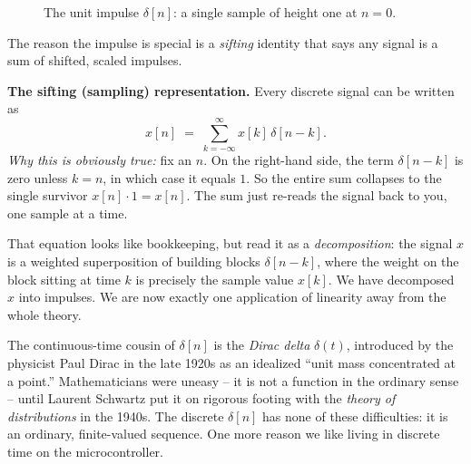 \begin{figure}[H]
\centering
{}
\caption{The unit impulse $\delta[n]$: a single sample of height one at $n=0$.}
\label{ch12:fig-impulse}
\end{figure}

The reason the impulse is special is a \emph{sifting} identity that says any
signal is a sum of shifted, scaled impulses.

\begin{formalbox}
\textbf{The sifting (sampling) representation.} Every discrete signal can be
written as
\[
  x[n] \;=\; \sum_{k=-\infty}^{\infty} x[k]\,\delta[n-k].
\]
\emph{Why this is obviously true:} fix an $n$. On the right-hand side, the term
$\delta[n-k]$ is zero unless $k=n$, in which case it equals $1$. So the entire
sum collapses to the single survivor $x[n]\cdot 1 = x[n]$. The sum just re-reads
the signal back to you, one sample at a time.
\end{formalbox}

That equation looks like bookkeeping, but read it as a \emph{decomposition}: the
signal $x$ is a weighted superposition of building blocks $\delta[n-k]$, where
the weight on the block sitting at time $k$ is precisely the sample value $x[k]$.
We have decomposed $x$ into impulses. We are now exactly one application of
linearity away from the whole theory.

\begin{historybox}
The continuous-time cousin of $\delta[n]$ is the \emph{Dirac delta} $\delta(t)$,
introduced by the physicist Paul Dirac in the late 1920s as an idealized ``unit
mass concentrated at a point.'' Mathematicians were uneasy -- it is not a
function in the ordinary sense -- until Laurent Schwartz put it on rigorous
footing with the \emph{theory of distributions} in the 1940s. The discrete
$\delta[n]$ has none of these difficulties: it is an ordinary, finite-valued
sequence. One more reason we like living in discrete time on the
microcontroller.
\end{historybox}

